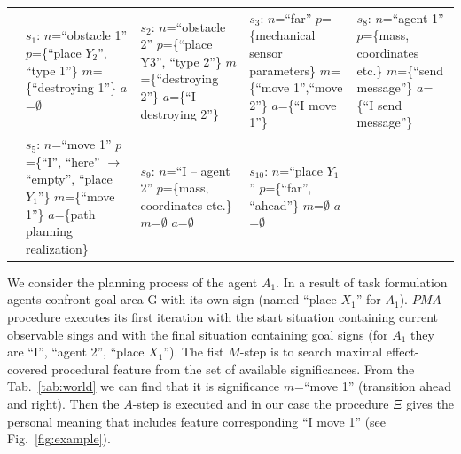 \documentclass[runningheads,a4paper]{llncs}
\begin{document}
\begin{table}
\begin{tabular}{| p{1.5cm} | p{2.2cm} | p{2.2cm} | p{2.2cm} | p{2.2cm} |}
		&
		$s_1$: $n$=``obstacle 1''\newline
		$p$=\{``place $Y_2$'', ``type 1''\}\newline
		$m$=\{``destroying 1''\}\newline
		$a$=$\emptyset$
		&
		$s_2$: $n$=``obstacle 2''\newline
		$p$=\{``place Y3'', ``type 2''\}\newline
		$m$=\{``destroying 2''\}\newline
		$a$=\{``I destroying 2''\}
		&
		$s_3$: $n$=``far''\newline
		$p$=\{mechanical sensor parameters\}\newline
		$m$=\{``move 1'',``move 2''\}\newline
		$a$=\{``I move 1''\}	
		&
		$s_8$: $n$=``agent 1''\newline
		$p$=\{mass, coordinates etc.\}\newline
		$m$=\{``send message''\}\newline
		$a$=\{``I send message''\}
		\\\cline{2-5}
		&
		$s_5$: $n$=``move 1''\newline
		$p$=\{``I'', ``here'' $\rightarrow$ ``empty'', ``place $Y_1$''\}\newline
		$m$=\{``move 1''\}\newline
		$a$=\{path planning realization\}	
		&
		$s_9$: $n$=``I – agent 2''\newline
		$p$=\{mass, coordinates etc.\}\newline
		$m$=$\emptyset$\newline
		$a$=$\emptyset$
		&
		$s_{10}$: $n$=``place $Y_1$''\newline
		$p$=\{``far'', ``ahead''\}\newline
		$m$=$\emptyset$\newline
		$a$=$\emptyset$	
		&
		\\\hline
	\end{tabular}
\end{table}

We consider the planning process of the agent $A_1$. In a result of task formulation agents confront goal area G with its own sign (named ``place $X_1$'' for $A_1$). $PMA$-procedure executes its first iteration with the start situation containing current observable sings and with the final situation containing goal signs (for $A_1$ they are ``I'', ``agent 2'', ``place $X_1$''). The fist $M$-step is to search maximal effect-covered procedural feature from the set of available significances. From the Tab.~\ref{tab:world} we can find that it is significance $m$=``move 1'' (transition ahead and right). Then the $A$-step is executed and in our case the procedure $\Xi$ gives the personal meaning that includes feature corresponding ``I move 1'' (see Fig.~\ref{fig:example}).
\end{document}
